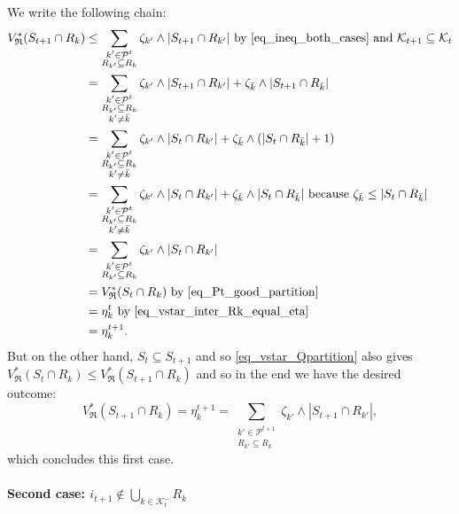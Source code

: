 \documentclass[
  11pt,
  a4paper,
]{article}
\let\oldparagraph\paragraph
\renewcommand{\paragraph}[1]{\oldparagraph{#1}\mbox{}}
\theoremstyle{plain}
\theoremstyle{plain}
\theoremstyle{plain}
\theoremstyle{definition}
\theoremstyle{definition}
\theoremstyle{remark}
\begin{document}
We write the following chain: \begin{align*}
V^*_{\mathfrak{R}}(S_{t+1}\cap R_k)&\leq \sum_{\substack{k'\in\mathcal{P}^{t}\\R_{k'}\subseteq R_k}} \zeta_{k'}\wedge |S_{t+1}\cap R_{k'}|\text{ by~\eqref{eq_ineq_both_cases} and }\mathcal{K}_{t+1}\subseteq\mathcal{K}_t\\
&=\sum_{\substack{k'\in\mathcal{P}^{t}\\R_{k'}\subseteq R_k\\ k'\neq\bar k}} \zeta_{k'}\wedge |S_{t+1}\cap R_{k'}| + \zeta_{\bar k}\wedge |S_{t+1}\cap R_{\bar k}| \\
&=\sum_{\substack{k'\in\mathcal{P}^{t}\\R_{k'}\subseteq R_k\\ k'\neq\bar k}} \zeta_{k'}\wedge |S_{t}\cap R_{k'}| + \zeta_{\bar k}\wedge( |S_{t}\cap R_{\bar k}| +1)\\
&=\sum_{\substack{k'\in\mathcal{P}^{t}\\R_{k'}\subseteq R_k\\ k'\neq\bar k}} \zeta_{k'}\wedge |S_{t}\cap R_{k'}| + \zeta_{\bar k}\wedge|S_{t}\cap R_{\bar k}|\text{ because $\zeta_{\bar k}\leq |S_t\cap R_{\bar k}|$}\\
&=\sum_{\substack{k'\in\mathcal{P}^{t}\\R_{k'}\subseteq R_k}} \zeta_{k'}\wedge |S_{t}\cap R_{k'}| \\
&=V^*_{\mathfrak{R}}(S_t\cap R_k)  \text{ by~\eqref{eq_Pt_good_partition}} \\
&= \eta_k^t  \text{ by~\eqref{eq_vstar_inter_Rk_equal_eta}} \\
&= \eta_k^{t+1}.\\
\end{align*} But on the other hand, \(S_t\subseteq S_{t+1}\) and so
\eqref{eq_vstar_Qpartition} also gives
\(V^*_{\mathfrak{R}}(S_t\cap R_k) \leq V^*_{\mathfrak{R}}(S_{t+1}\cap R_k)\)
and so in the end we have the desired outcome: \begin{equation*}
V^*_{\mathfrak{R}}(S_{t+1}\cap R_k) =  \eta_k^{t+1} =  \sum_{\substack{k'\in\mathcal{P}^{t+1}\\R_{k'}\subseteq R_k}} \zeta_{k'}\wedge |S_{t+1}\cap R_{k'}| ,
\end{equation*} which concludes this first case.

\paragraph{\texorpdfstring{Second case:
\(i_{t+1}\not\in\bigcup_{k\in\mathcal{K}^-_{t}}R_k\)}{Second case: i\_\{t+1\}\textbackslash not\textbackslash in\textbackslash bigcup\_\{k\textbackslash in\textbackslash mathcal\{K\}\^{}-\_\{t\}\}R\_k}}\label{second-case-i_t1notinbigcup_kinmathcalk-_tr_k}
\end{document}
